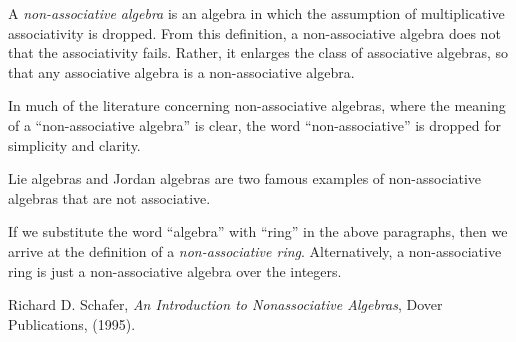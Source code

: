 \documentclass[12pt]{article}
\begin{document}
A \emph{non-associative algebra} is an algebra in which the assumption of multiplicative associativity is dropped.  From this definition, a non-associative algebra does not  that the associativity fails.  Rather, it enlarges the class of associative algebras, so that any associative algebra is a non-associative algebra.  

In much of the literature concerning non-associative algebras, where the meaning of a ``non-associative algebra'' is clear, the word ``non-associative'' is dropped for simplicity and clarity.

Lie algebras and Jordan algebras are two famous examples of non-associative algebras that are not associative.

If we substitute the word ``algebra'' with ``ring'' in the above paragraphs, then we arrive at the definition of a \emph{non-associative ring}.  Alternatively, a non-associative ring is just a non-associative algebra over the integers.

\begin{thebibliography}{6}
 Richard D. Schafer, {\em An Introduction to Nonassociative Algebras}, Dover Publications, (1995).
\end{thebibliography}
\end{document}
